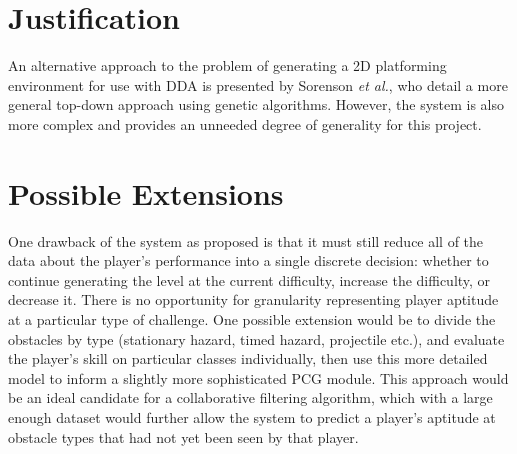 \documentclass[a4paper,oneside,12pt,openany]{memoir}
\begin{document}
 \section{Justification}
An alternative approach to the problem of generating a 2D platforming environment for use with DDA is presented by Sorenson \emph{et al.}\cite{5940995}, who detail a more general top-down approach using genetic algorithms. However, the system is also more complex and provides an unneeded degree of generality for this project. 
 
\section{Possible Extensions}
One drawback of the system as proposed is that it must still reduce all of the data about the player's performance into a single discrete decision: whether to continue generating the level at the current difficulty, increase the difficulty, or decrease it. There is no opportunity for granularity representing player aptitude at a particular type of challenge. One possible extension would be to divide the obstacles by type (stationary hazard, timed hazard, projectile etc.), and evaluate the player's skill on particular classes individually, then use this more detailed model to inform a slightly more sophisticated PCG module. This approach would be an ideal candidate for a collaborative filtering algorithm, which with a large enough dataset would further allow the system to predict a player's aptitude at obstacle types that had not yet been seen by that player.

% 
% 
\end{document}
